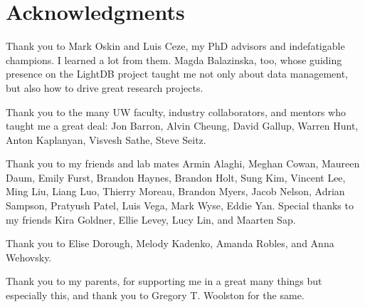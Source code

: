 
\bigskip

\begingroup
\let\clearpage\relax
\let\cleardoublepage\relax
\let\cleardoublepage\relax
\chapter*{Acknowledgments}

Thank you to Mark Oskin and Luis Ceze, my PhD advisors and indefatigable champions.
I learned a lot from them.
Magda Balazinska, too, whose guiding presence on the LightDB project taught me not only about data management, but also how to drive great research projects.

Thank you to the many UW faculty, industry collaborators, and mentors who taught me a great deal: Jon Barron, Alvin Cheung, David Gallup, Warren Hunt, Anton Kaplanyan, Visvesh Sathe, Steve Seitz.

Thank you to my friends and lab mates Armin Alaghi, Meghan Cowan, Maureen Daum, Emily Furst, Brandon Haynes, Brandon Holt, Sung Kim, Vincent Lee, Ming Liu, Liang Luo, Thierry Moreau, Brandon Myers, Jacob Nelson, Adrian Sampson, Pratyush Patel, Luis Vega, Mark Wyse, Eddie Yan. Special thanks to my friends Kira Goldner, Ellie Levey, Lucy Lin, and Maarten Sap.

Thank you to Elise Dorough, Melody Kadenko, Amanda Robles, and Anna Wehovsky.

Thank you to my parents, for supporting me in a great many things but especially this, and thank you to Gregory T. Woolston for the same.

\endgroup
